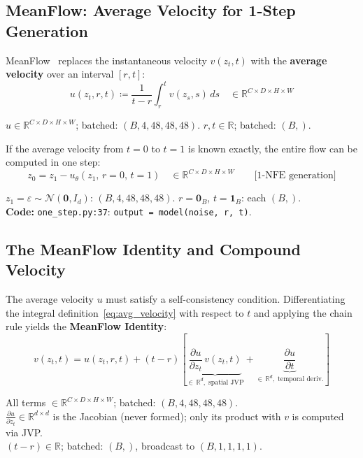 \documentclass[11pt,a4paper]{article}
\newcommand{\code}[1]{\texttt{#1}}
\begin{document}
\subsection{MeanFlow: Average Velocity for 1-Step Generation}

MeanFlow~\cite{meanflow} replaces the instantaneous velocity $v(z_t,t)$ with
the \textbf{average velocity} over an interval $[r,t]$:
\begin{equation}
  u(z_t,r,t)
    \coloneqq \frac{1}{t-r}\int_r^t v(z_s,s)\,ds
    \quad \in \mathbb{R}^{C \times D \times H \times W}
  \label{eq:avg_velocity}
\end{equation}
\begin{shapes}
$u \in \mathbb{R}^{C \times D \times H \times W}$;
\quad batched: $(B, 4, 48, 48, 48)$.
\quad $r, t \in \mathbb{R}$; batched: $(B,)$.
\end{shapes}

\noindent
If the average velocity from $t{=}0$ to $t{=}1$ is known exactly, the entire
flow can be computed in one step:
\begin{equation}
  z_0 = z_1 - u_\theta(z_1,\,r{=}0,\,t{=}1)
  \quad \in \mathbb{R}^{C \times D \times H \times W}
  \qquad \text{[1-NFE generation]}
  \label{eq:one_nfe}
\end{equation}
\begin{shapes}
$z_1 = \varepsilon \sim \mathcal{N}(\mathbf{0}, I_d)$: $(B, 4, 48, 48, 48)$.
\quad $r = \mathbf{0}_B$, $t = \mathbf{1}_B$: each $(B,)$.\\
\textbf{Code:} \code{one\_step.py:37}: \code{output = model(noise, r, t)}.
\end{shapes}

\subsection{The MeanFlow Identity and Compound Velocity}
\label{sec:compound_v}

The average velocity $u$ must satisfy a self-consistency condition.
Differentiating the integral definition~\eqref{eq:avg_velocity} with respect
to $t$ and applying the chain rule yields the \textbf{MeanFlow Identity}:
\begin{equation}
  v(z_t,t)
    = u(z_t,r,t)
      + (t-r)\!\left[
          \underbrace{\frac{\partial u}{\partial z_t}\,v(z_t,t)}_{
            \in\,\mathbb{R}^{d},\;\text{spatial JVP}}
          + \underbrace{\frac{\partial u}{\partial t}}_{
            \in\,\mathbb{R}^{d},\;\text{temporal deriv.}}
        \right]
  \label{eq:mf_identity}
\end{equation}
\begin{shapes}
All terms $\in \mathbb{R}^{C \times D \times H \times W}$; batched: $(B, 4, 48, 48, 48)$.\\
$\frac{\partial u}{\partial z_t} \in \mathbb{R}^{d \times d}$ is the Jacobian
(never formed); only its product with $v$ is computed via JVP.\\
$(t-r) \in \mathbb{R}$; batched: $(B,)$, broadcast to $(B,1,1,1,1)$.
\end{shapes}
\end{document}

